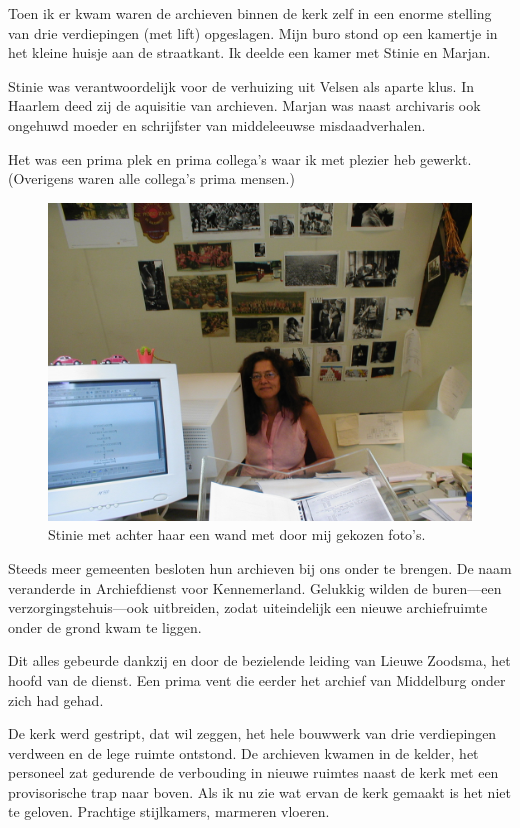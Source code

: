 \documentclass[10pt,twoside, openright]{memoir}
\begin{document}
Toen ik er kwam waren de archieven binnen de kerk zelf in een enorme stelling van drie verdiepingen (met lift) opgeslagen. Mijn buro stond op een kamertje in het kleine huisje aan de straatkant. Ik deelde een kamer met Stinie en Marjan.

Stinie was verantwoordelijk voor de verhuizing uit Velsen als aparte klus. In Haarlem deed zij de aquisitie van archieven. Marjan was naast archivaris ook ongehuwd moeder en schrijfster van middeleeuwse misdaadverhalen.

Het was een prima plek en prima collega’s waar ik met plezier heb gewerkt. (Overigens waren alle collega’s prima mensen.)

\begin{figure}
\includegraphics[width=\textwidth]{img/ch47/Stinie}
\caption*{\footnotesize Stinie met achter haar een wand met door mij gekozen foto's.}
\end{figure}

Steeds meer gemeenten besloten hun archieven bij ons onder te brengen. De naam veranderde in Archiefdienst voor Kennemerland. Gelukkig wilden de buren---een verzorgingstehuis---ook uitbreiden, zodat uiteindelijk een nieuwe archiefruimte onder de grond kwam te liggen. 

Dit alles gebeurde dankzij en door de bezielende leiding van Lieuwe Zoodsma, het hoofd van de dienst. Een prima vent die eerder het archief van Middelburg onder zich had gehad.

De kerk werd gestript, dat wil zeggen, het hele bouwwerk van drie verdiepingen verdween en de lege ruimte ontstond. De archieven kwamen in de kelder, het personeel zat gedurende de verbouding in nieuwe ruimtes naast de kerk met een provisorische trap naar boven. Als ik nu zie wat ervan de kerk gemaakt is het niet te geloven. Prachtige stijlkamers, marmeren vloeren.
\end{document}

